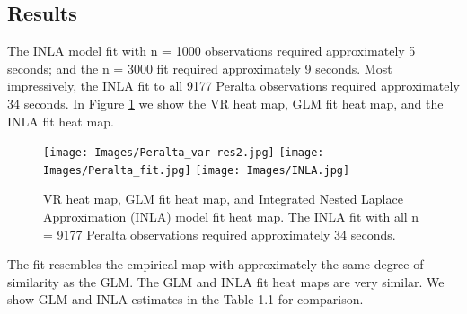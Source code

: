 \subsection{Results}
The INLA model fit with n = 1000 observations required approximately 5 seconds; and the n = 3000 fit required approximately 9 seconds. Most impressively, the INLA fit to all 9177 Peralta observations required approximately 34 seconds. In Figure \ref{fig:INLA} we show the VR heat map, GLM fit heat map, and the INLA fit heat map.
  \begin{figure}[H]
	\centering 	
	\texttt{[image: Images/Peralta\_var-res2.jpg]}
	\texttt{[image: Images/Peralta\_fit.jpg]}
	\texttt{[image: Images/INLA.jpg]}
	\caption{VR heat map, GLM fit heat map, and Integrated Nested Laplace Approximation (INLA) model fit heat map. The INLA fit with all n = 9177 Peralta observations required approximately 34 seconds.}
	\label{fig:INLA}
	\end{figure}
The fit resembles the empirical map with approximately the same degree of similarity as the GLM. The GLM and INLA fit heat maps are very similar. We show GLM and INLA estimates in the Table 1.1 for comparison.
